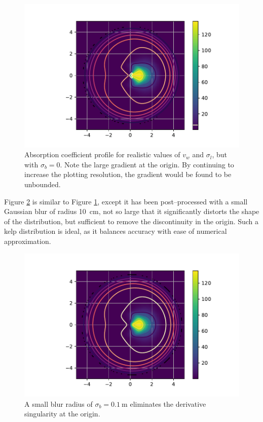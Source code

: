 \documentclass[ms,cpyr,lof,lot]{uathesis}
\begin{document}
\begin{figure}[H]
  \centering
  \vspace{-3em}
  \includegraphics[width=5in]{kelp_dist_smooth}
  \caption{Absorption coefficient profile for realistic values of $v_w$ and $\sigma_l$, but with $\sigma_b=0$. Note the large gradient at the origin. By continuing to increase the plotting resolution, the gradient would be found to be unbounded.}
  \label{fig:kelp_dist_smooth}
\end{figure}

Figure \ref{fig:kelp_dist_smooth_smallblur} is similar to Figure \ref{fig:kelp_dist_smooth}, except it has been post--processed with a small Gaussian blur of radius \SI{10}{cm}, not so large that it significantly distorts the shape of the distribution, but sufficient to remove the discontinuity in the origin.
Such a kelp distribution is ideal, as it balances accuracy with ease of numerical approximation.
\begin{figure}[H]
  \centering
  \vspace{-3em}
  \includegraphics[width=5in]{kelp_dist_smooth_smallblur}
  \caption{A small blur radius of $\sigma_b=\SI{0.1}{\m}$ eliminates the derivative singularity at the origin.}
  \label{fig:kelp_dist_smooth_smallblur}
\end{figure}
\end{document}
